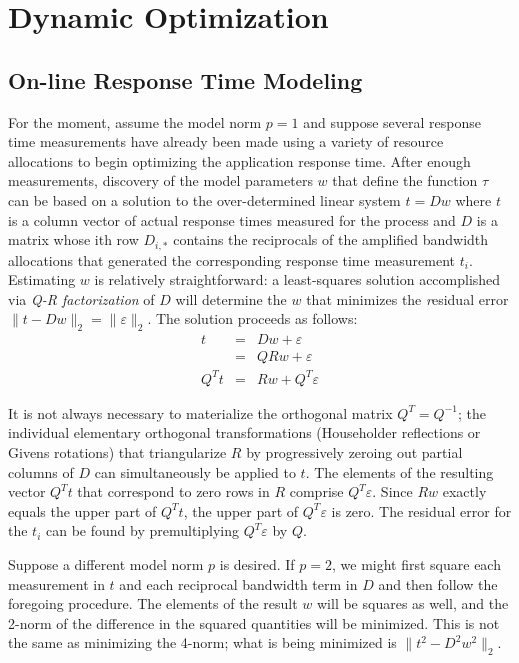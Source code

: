 \section{Dynamic Optimization}


\subsection*{On-line Response Time Modeling}

For the moment, assume the model norm $p = 1$ and suppose several response time measurements have already been made using a variety of resource allocations to begin optimizing the application response time.  After enough measurements, discovery of the model parameters $w$ that define the function $\tau$ can be based on a solution to the over-determined linear system
$t=Dw$
where $t$ is a column vector of actual response times measured for the process
and $D$ is a matrix whose ith row $D_{i,*}$ contains the reciprocals of the amplified bandwidth allocations
that generated the corresponding response time measurement $t_i$.
Estimating $w$ is relatively straightforward: a least-squares solution accomplished via
\emph{Q-R factorization}\cite{GoVL} of $D$ will determine the $w$ that minimizes the \emph residual error $\|t - Dw\|_2 = \|\varepsilon\|_2$.
The solution proceeds as follows:
\begin{eqnarray*}
t    &=& Dw  + \varepsilon    \\
        &=& QRw + \varepsilon    \\
Q^Tt &=& Rw  + Q^T\varepsilon
\end{eqnarray*}

It is not always necessary to materialize the orthogonal matrix $Q^T = Q^{-1}$;
the individual elementary orthogonal transformations (Householder reflections or Givens rotations)
that triangularize $R$ by progressively zeroing out partial columns of $D$ can simultaneously be applied to $t$.
The elements of the resulting vector $Q^Tt$ that correspond to zero rows in $R$ comprise $Q^T\varepsilon$.
Since $Rw$ exactly equals the upper part of $Q^Tt$, the upper part of $Q^T\varepsilon$ is zero. The residual error for the $t_i$
can be found by premultiplying $Q^T\varepsilon$ by $Q$.

Suppose a different model norm $p$ is desired.  If $p = 2$, we might first square each measurement in $t$
and each reciprocal bandwidth term in $D$ and then follow the foregoing procedure.
The elements of the result $w$ will be squares as well, and the 2-norm of the difference in the squared quantities will be minimized.  This is not the same as minimizing the 4-norm; what is being minimized is $\|t^2 - D^2w^2\|_2$.

